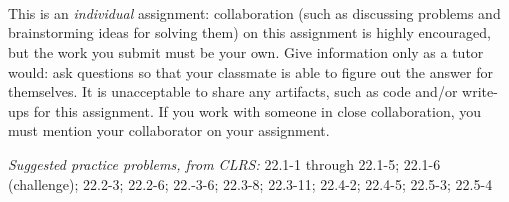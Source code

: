 \documentclass[letterpaper,11pt]{article}
\begin{document}


 \\

 \\
 \\

This is an \emph{individual} assignment: collaboration (such as discussing problems and brainstorming ideas for solving them) on this assignment is highly encouraged, but the work you submit must be your own. Give information only as a tutor would: ask questions so that your classmate is able to figure out the answer for themselves. It is unacceptable to share any artifacts, such as code and/or write-ups for this assignment. If you work with someone in close collaboration, you must mention your collaborator on your assignment.

\emph{Suggested practice problems, from CLRS:} 22.1-1 through 22.1-5; 22.1-6 (challenge); 22.2-3; 22.2-6; 22.-3-6; 22.3-8; 22.3-11; 22.4-2; 22.4-5; 22.5-3; 22.5-4
\end{document}
